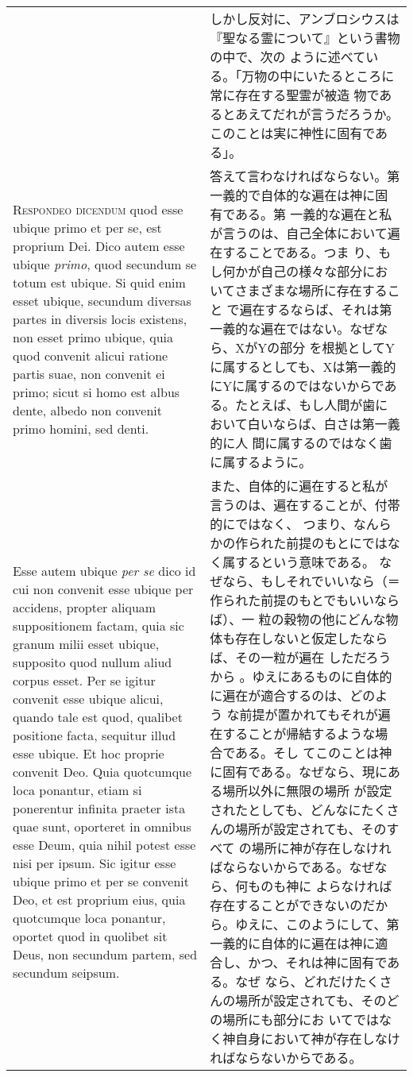 \documentclass[10pt]{jsarticle} %
\begin{document}
\begin{longtable}{p{21em}p{21em}}
&

しかし反対に、アンブロシウスは『聖なる霊について』という書物の中で、次の
 ように述べている。「万物の中にいたるところに常に存在する聖霊が被造
 物であるとあえてだれが言うだろうか。このことは実に神性に固有であ
 る」。

\\

{\scshape Respondeo dicendum} quod esse ubique primo et per se, est proprium
 Dei. Dico autem esse ubique {\itshape primo}, quod secundum se totum est
 ubique. Si quid enim esset ubique, secundum diversas partes in diversis
 locis existens, non esset primo ubique, quia quod convenit alicui
 ratione partis suae, non convenit ei primo; sicut si homo est albus
 dente, albedo non convenit primo homini, sed denti. 


&

答えて言わなければならない。第一義的で自体的な遍在は神に固有である。第
 一義的な遍在と私が言うのは、自己全体において遍在することである。つま
 り、もし何かが自己の様々な部分においてさまざまな場所に存在すること
 で遍在するならば、それは第一義的な遍在ではない。なぜなら、XがYの部分
 を根拠としてYに属するとしても、Xは第一義的にYに属するのではないからであ
 る。たとえば、もし人間が歯において白いならば、白さは第一義的に人
 間に属するのではなく歯に属するように。

\\


Esse autem ubique {\itshape per se} dico id cui non convenit esse ubique
 per accidens, propter aliquam suppositionem factam, quia sic granum
 milii  esset ubique, supposito quod nullum aliud corpus esset. Per se
 igitur convenit esse ubique alicui, quando tale est quod, qualibet
 positione facta, sequitur illud esse ubique. Et hoc proprie convenit
 Deo. Quia quotcumque loca ponantur, etiam si ponerentur infinita
 praeter ista quae sunt, oporteret in omnibus esse Deum, quia nihil
 potest esse nisi per ipsum. Sic igitur esse ubique primo et per se
 convenit Deo, et est proprium eius, quia quotcumque loca ponantur,
 oportet quod in quolibet sit Deus, non secundum partem, sed secundum
 seipsum.

&

また、自体的に遍在すると私が言うのは、遍在することが、付帯的にではなく、
 つまり、なんらかの作られた前提のもとにではなく属するという意味である。
 なぜなら、もしそれでいいなら（＝作られた前提のもとでもいいならば）、一
 粒の穀物の他にどんな物体も存在しないと仮定したならば、その一粒が遍在
 しただろうから 。ゆえにあるものに自体的に遍在が適合するのは、どのよう
 な前提が置かれてもそれが遍在することが帰結するような場合である。そし
 てこのことは神に固有である。なぜなら、現にある場所以外に無限の場所
 が設定されたとしても、どんなにたくさんの場所が設定されても、そのすべて
 の場所に神が存在しなければならないからである。なぜなら、何ものも神に
 よらなければ存在することができないのだから。ゆえに、このようにして、第
 一義的に自体的に遍在は神に適合し、かつ、それは神に固有である。なぜ
 なら、どれだけたくさんの場所が設定されても、そのどの場所にも部分にお
 いてではなく神自身において神が存在しなければならないからである。


\end{longtable}
\end{document}

